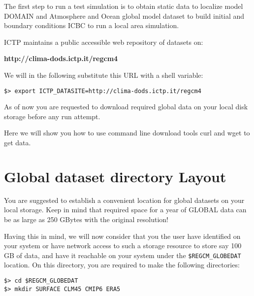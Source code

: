 
\label{obtaindata}

The first step to run a test simulation is to obtain static data to localize
model DOMAIN and Atmosphere and Ocean global model dataset to build initial
and boundary conditions ICBC to run a local area simulation.

ICTP maintains a public accessible web repository of datasets on:

{\bf http://clima-dods.ictp.it/regcm4 }

We will in the following substitute this URL with a shell variable:

\begin{Verbatim}
$> export ICTP_DATASITE=http://clima-dods.ictp.it/regcm4
\end{Verbatim}

As of now you are requested to download required global data on your local disk
storage before any run attempt.

Here we will show you how to use command line download tools curl and
wget to get data.

\section{Global dataset directory Layout}

You are suggested to establish a convenient location for global datasets
on your local storage. Keep in mind that required space for a year of GLOBAL
data can be as large as 250 GBytes with the original resolution!

Having this in mind, we will now consider that you the user have identified
on your system or have network access to such a storage resource to store say
100 GB of data, and have it reachable on your system under the
\verb=$REGCM_GLOBEDAT= location.
On this directory, you are required to make the following directories:

\begin{Verbatim}
$> cd $REGCM_GLOBEDAT
$> mkdir SURFACE CLM45 CMIP6 ERA5
\end{Verbatim}

